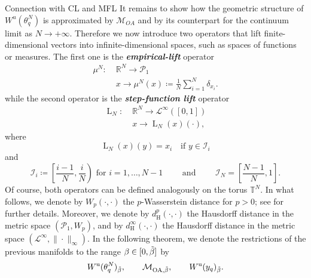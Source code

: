 \documentclass{article}
\theoremstyle{definition}
\newcommand{\R}{\mathbb{R}}
\newcommand{\T}{\mathbb{T}}
\renewcommand{\u}{\textnormal{u}}
\renewcommand{\L}{\operatorname{L}}
\renewcommand{\H}{\operatorname{H}}
\begin{document}
\begin{section}{Connection with CL and MFL}
It remains to show how the geometric structure of $W^u(\theta^N_q)$ is approximated by $\mathcal{M}_{OA}$ and by its counterpart for the continuum limit as $N\rightarrow+\infty$. Therefore we now introduce two operators that lift finite-dimensional vectors into infinite-dimensional spaces, such as spaces of functions or measures. The first one is the \textbf{\textit{empirical-lift}} operator
\begin{align*}
    \mu^N:&\;\R^N\longrightarrow\mathcal{P}_1\\
             &\;x\longrightarrow\mu^N(x)\coloneqq\frac{1}{N}\sum_{i=1}^N\delta_{x_i}.
\end{align*}
while the second operator is the \textbf{\textit{step-function lift}} operator
\begin{align*}
    \L_N:&\;\R^N\longrightarrow\mathcal L^\infty([0,1])\\
             &\;x\longrightarrow\L_N(x)(\cdot),
\end{align*}
where
$$\L_N(x)(y)=x_i\quad\text{if }y\in\mathcal{I}_i$$
and
$$\mathcal{I}_i\coloneqq\left[\frac{i-1}{N},\frac{i}{N}\right)\text{ for }i=1,\ldots,N-1\qquad\text{ and }\qquad \mathcal{I}_N=\left[\frac{N-1}{N},1\right].$$
Of course, both operators can be defined analogously on the torus $\T^N$. In what follows, we denote by $W_p(\cdot,\cdot)$ the $p$-Wasserstein distance for $p>0$; see \cite{villani2008optimal} for further details. Moreover, we denote by $d_{\H}^{p}(\cdot,\cdot)$ the Hausdorff distance in the metric space $(\mathcal{P}_1,W_p)$, and by $d_{\H}^{\infty}(\cdot,\cdot)$ the Hausdorff distance in the metric space $(\mathcal L^\infty,\|\cdot\|_\infty)$. In the following theorem, we denote the restrictions of the previous manifolds to the range $\beta\in[0,\Tilde{\beta}]$ by
$$W^\u(\theta^N_q)_{\Tilde{\beta}},\qquad \mathcal{M}_{\mathrm{OA},{\Tilde{\beta}}},\qquad W^\u(y_q)_{\Tilde{\beta}}.$$


\end{section}
\end{document}

